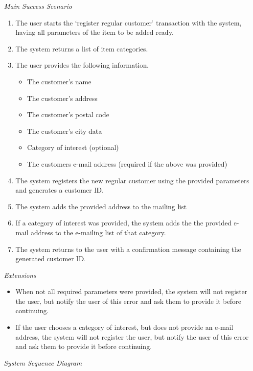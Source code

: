 \textsl{Main Success Scenario}
\begin{enumerate}[noitemsep]
	\item The user starts the `register regular customer' transaction with the system, having all parameters of the item to be added ready.
	\item The system returns a list of item categories.
	\item The user provides the following information.
	\begin{itemize}[noitemsep]
		\item The customer's name
		\item The customer's address
		\item The customer's postal code
		\item The customer's city data
		\item Category of interest (optional)
		\item The customers e-mail address (required if the above was provided)
	\end{itemize}
	\item The system registers the new regular customer using the provided parameters and generates a customer ID.
	\item The system adds the provided address to the mailing list
	\item If a category of interest was provided, the system adds the the provided e-mail address to the e-mailing list of that category.
	\item The system returns to the user with a confirmation message containing the generated customer ID. 
\end{enumerate}
\textsl{Extensions}
\begin{itemize}[noitemsep]
	\item When not all required parameters were provided, the system will not register the user, but notify the user of this error and ask them to provide it before continuing.
	\item If the user chooses a category of interest, but does not provide an e-mail address, the system will not register the user, but notify the user of this error and ask them to provide it before continuing.
\end{itemize}
\textsl{System Sequence Diagram}
